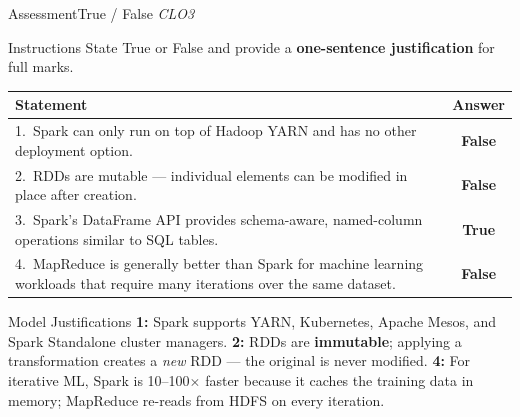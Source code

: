 \documentclass[aspectratio=169,10pt]{beamer}
\begin{document}
\begin{frame}{Assessment\textemdash True / False \hfill\small\textit{CLO3}}
  \begin{block}{Instructions}
    State True or False and provide a \textbf{one-sentence justification} for full marks.
  \end{block}
  \vspace{6pt}
  \centering
  \renewcommand{\arraystretch}{1.6}
  \begin{tabular}{p{9.2cm}c}
    \toprule
    \textbf{Statement} & \textbf{Answer} \\
    \midrule
    1.\ Spark can only run on top of Hadoop YARN and has no other deployment option. &
    \alert{\textbf{False}} \\
    2.\ RDDs are mutable — individual elements can be modified in place after creation. &
    \alert{\textbf{False}} \\
    3.\ Spark's DataFrame API provides schema-aware, named-column operations similar to SQL tables. &
    \textbf{True} \\
    4.\ MapReduce is generally better than Spark for machine learning workloads that require many iterations over the same dataset. &
    \alert{\textbf{False}} \\
    \bottomrule
  \end{tabular}
  \vspace{6pt}
  \begin{exampleblock}{Model Justifications}
    \small \textbf{1:} Spark supports YARN, Kubernetes, Apache Mesos, and Spark Standalone cluster managers.  \textbf{2:} RDDs are \textbf{immutable}; applying a transformation creates a \emph{new} RDD — the original is never modified.  \textbf{4:} For iterative ML, Spark is 10--100$\times$ faster because it caches the training data in memory; MapReduce re-reads from HDFS on every iteration.
  \end{exampleblock}
\end{frame}
\end{document}
